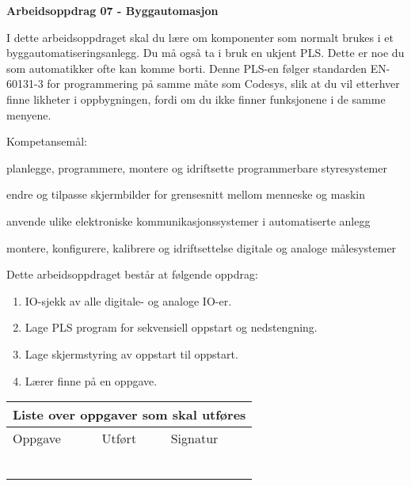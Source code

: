 
\noindent
{\bf Arbeidsoppdrag 07 - Byggautomasjon}

\vskip 5pt

I dette arbeidsoppdraget skal du lære om komponenter som normalt brukes i et byggautomatiseringsanlegg. Du må også ta i bruk en ukjent PLS. Dette er noe du som automatikker ofte kan komme borti. Denne PLS-en følger standarden EN-60131-3 for programmering på samme måte som Codesys, slik at du vil etterhver finne likheter i oppbygningen, fordi om du ikke finner funksjonene i de samme menyene. 

Kompetansemål:

planlegge, programmere, montere og idriftsette programmerbare styresystemer

endre og tilpasse skjermbilder for grensesnitt mellom menneske og maskin

anvende ulike elektroniske kommunikasjonssystemer i automatiserte anlegg

montere, konfigurere, kalibrere og idriftsettelse digitale og analoge målesystemer

Dette arbeidsoppdraget består at følgende oppdrag:
\begin{enumerate}
	\item IO-sjekk av alle digitale- og analoge IO-er. 
	\item Lage PLS program for sekvensiell oppstart og nedstengning. 
	\item Lage skjermstyring av oppstart til oppstart.
	\item Lærer finne på en oppgave. 
\end{enumerate}
\begin{center}
\begin{tabular}{ | m{8cm} | m{1cm}| m{2cm} | } 
\hline
\multicolumn{3}{|c|}{Liste over oppgaver som skal utføres} \\
	\hline
	Oppgave	& Utført & Signatur \\ 
	\hline
	\hline
	& & \\ 
	\hline
	& & \\ 
	\hline
	& & \\ 
	\hline
	& & \\ 
	\hline
	& & \\ 
	\hline
	& & \\ 
	\hline
\end{tabular}
\end{center}



